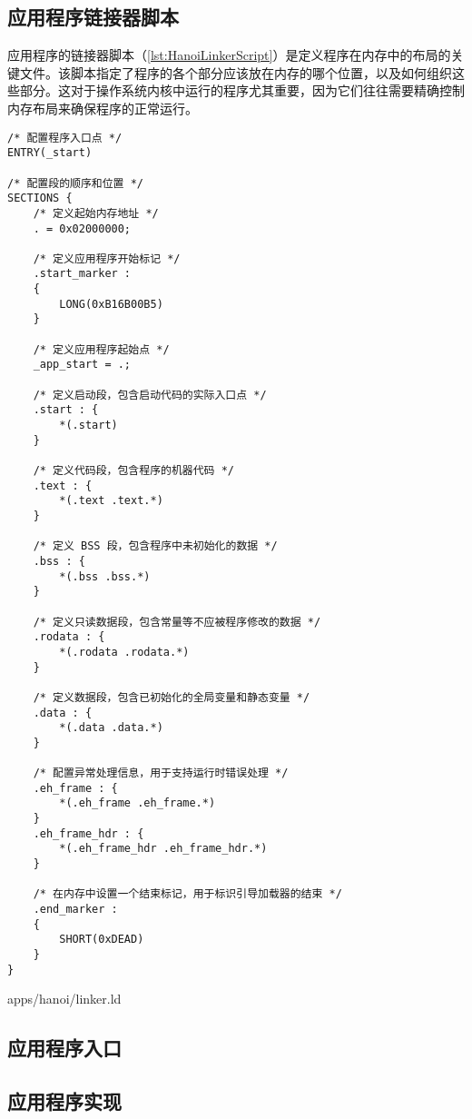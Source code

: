 \subsection{应用程序链接器脚本}

应用程序的链接器脚本（\cref{lst:HanoiLinkerScript}）是定义程序在内存中的布局的关键文件。该脚本指定了程序的各个部分应该放在内存的哪个位置，以及如何组织这些部分。这对于操作系统内核中运行的程序尤其重要，因为它们往往需要精确控制内存布局来确保程序的正常运行。

\begin{listing}[htbp]
    \begin{verbatim}
/* 配置程序入口点 */
ENTRY(_start)

/* 配置段的顺序和位置 */
SECTIONS {
    /* 定义起始内存地址 */
    . = 0x02000000;

    /* 定义应用程序开始标记 */
    .start_marker :
    {
        LONG(0xB16B00B5)
    }

    /* 定义应用程序起始点 */
    _app_start = .;

    /* 定义启动段，包含启动代码的实际入口点 */
    .start : {
        *(.start)
    }

    /* 定义代码段，包含程序的机器代码 */
    .text : {
        *(.text .text.*)
    }

    /* 定义 BSS 段，包含程序中未初始化的数据 */
    .bss : {
        *(.bss .bss.*)
    }

    /* 定义只读数据段，包含常量等不应被程序修改的数据 */
    .rodata : {
        *(.rodata .rodata.*)
    }

    /* 定义数据段，包含已初始化的全局变量和静态变量 */
    .data : {
        *(.data .data.*)
    }

    /* 配置异常处理信息，用于支持运行时错误处理 */
    .eh_frame : {
        *(.eh_frame .eh_frame.*)
    }
    .eh_frame_hdr : {
        *(.eh_frame_hdr .eh_frame_hdr.*)
    }

    /* 在内存中设置一个结束标记，用于标识引导加载器的结束 */
    .end_marker :
    {
        SHORT(0xDEAD)
    }
}
    \end{verbatim}
    \caption{apps/hanoi/linker.ld}\label{lst:HanoiLinkerScript}
\end{listing}

\subsection{应用程序入口}

\subsection{应用程序实现}